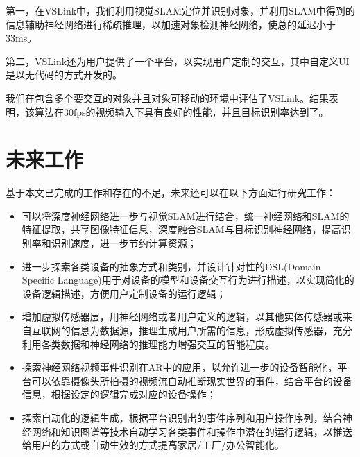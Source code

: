 第一，在VSLink中，我们利用视觉SLAM定位并识别对象，并利用SLAM中得到的信息辅助神经网络进行稀疏推理，以加速对象检测神经网络，使总的延迟小于33ms。

第二，VSLink还为用户提供了一个平台，以实现用户定制的交互，其中自定义UI是以无代码的方式开发的。

我们在包含多个要交互的对象并且对象可移动的环境中评估了VSLink。结果表明，该算法在30fps的视频输入下具有良好的性能，并且目标识别率达到了{\acc}。
\section{未来工作}
基于本文已完成的工作和存在的不足，未来还可以在以下方面进行研究工作：
\begin{itemize}
	\item 可以将深度神经网络进一步与视觉SLAM进行结合，统一神经网络和SLAM的特征提取，共享图像特征信息，深度融合SLAM与目标识别神经网络，提高识别率和识别速度，进一步节约计算资源；
	\item 进一步探索各类设备的抽象方式和类别，并设计针对性的DSL(Domain Specific Language)用于对设备的模型和设备交互行为进行描述，以实现简化的设备逻辑描述，方便用户定制设备的运行逻辑；
	\item 增加虚拟传感器层，用神经网络或者用户定义的逻辑，以其他实体传感器或来自互联网的信息为数据源，推理生成用户所需的信息，形成虚拟传感器，充分利用各类数据和神经网络的推理能力增强交互的智能程度。
	\item 探索神经网络视频事件识别在AR中的应用，以允许进一步的设备智能化，平台可以依靠摄像头所拍摄的视频流自动推断现实世界的事件，结合平台的设备信息，根据设定的逻辑完成对应的设备操作；
	\item 探索自动化的逻辑生成，根据平台识别出的事件序列和用户操作序列，结合神经网络和知识图谱等技术自动学习各类事件和操作中潜在的运行逻辑，以推送给用户的方式或自动生效的方式提高家居/工厂/办公智能化。
\end{itemize}




